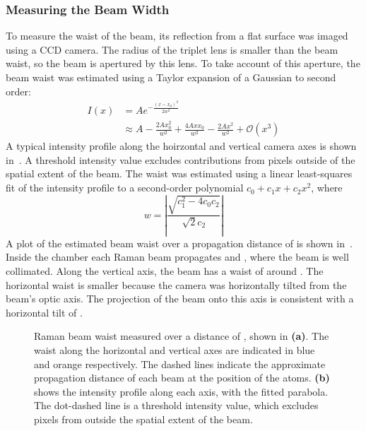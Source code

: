 \subsubsection{Measuring the Beam Width}
To measure the waist of the beam, its reflection from a flat surface was imaged
using a CCD camera. The radius of the triplet lens is smaller than the beam
waist, so the beam is apertured by this lens. To take account of this aperture,
the beam waist was estimated using a Taylor expansion of a Gaussian to second
order:
\begin{align}
	I(x) & = A e^{-\frac{(x-x_0)^2}{2 w^2}} \nonumber                                                                              \\
	     & \approx A-\frac{2 A x_0^2}{w^2}+\frac{4 A x x_0}{w^2}-\frac{2 A x^2}{w^2} + \mathcal{O}(x^3) \label{eq:gaussian_approx}
\end{align}
A typical intensity profile along the hoirzontal and vertical camera axes is
shown in~. A threshold intensity value excludes
contributions from pixels outside of the spatial extent of the beam. The waist
was estimated using a linear least-squares fit of the intensity profile to a
second-order polynomial \(c_0 + c_1 x + c_2 x^2\), where \begin{equation} w =
\left|\frac{\sqrt{c_1^2-4c_0 c_2}}{\sqrt{2}c_2} \right| \end{equation} A plot of
the estimated beam waist over a propagation distance of  is
shown in~. Inside the chamber each Raman beam
propagates  and , where
the beam is well collimated. Along the vertical axis, the beam has a waist of
around . The horizontal waist is smaller because the
camera was horizontally tilted from the beam's optic axis. The projection of the
beam onto this axis is consistent with a horizontal tilt of
.  \begin{figure} \centering
	\def\svgwidth{\columnwidth}
	\caption[Measured Raman beam waist]{Raman beam waist measured over a distance
		of , shown in \textbf{(a)}. The waist along the
		horizontal and vertical axes are indicated in blue and orange respectively.
		The dashed lines indicate the approximate propagation distance of each beam
		at the position of the atoms. \textbf{(b)} shows the intensity profile along
		each axis, with the fitted parabola. The dot-dashed line is a threshold
		intensity value, which excludes pixels from outside the spatial extent of
		the beam.} \label{fig:beam_waist_plots} \end{figure}
